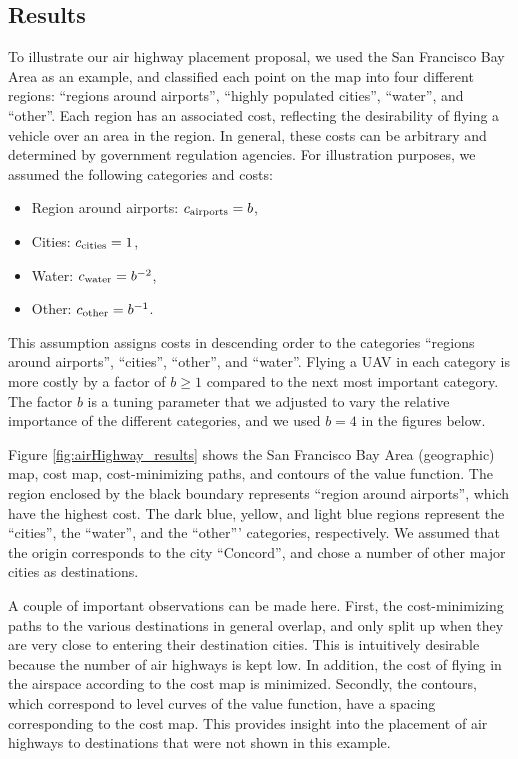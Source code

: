 \subsection{Results}
To illustrate our air highway placement proposal, we used the San Francisco Bay Area as an example, and classified each point on the map into four different regions: ``regions around airports'', ``highly populated cities'', ``water'', and ``other''. Each region has an associated cost, reflecting the desirability of flying a vehicle over an area in the region. In general, these costs can be arbitrary and determined by government regulation agencies. For illustration purposes, we assumed the following categories and costs:

\begin{itemize}
\item Region around airports: $c_\text{airports}=b$,
\item Cities: $c_\text{cities}=1$,
\item Water: $c_\text{water}=b^{-2}$,
\item Other: $c_\text{other}=b^{-1}$.
\end{itemize}

This assumption assigns costs in descending order to the categories ``regions around airports'', ``cities'', ``other'', and ``water''. Flying a UAV in each category is more costly by a factor of $b\ge1$ compared to the next most important category. The factor $b$ is a tuning parameter that we adjusted to vary the relative importance of the different categories, and we used $b=4$ in the figures below.

Figure \ref{fig:airHighway_results} shows the San Francisco Bay Area (geographic) map, cost map, cost-minimizing paths, and contours of the value function. The region enclosed by the black boundary represents ``region around airports'', which have the highest cost. The dark blue, yellow, and light blue regions represent the ``cities'', the ``water'', and the ``other''' categories, respectively. We assumed that the origin corresponds to the city ``Concord'', and chose a number of other major cities as destinations.

A couple of important observations can be made here. First, the cost-minimizing paths to the various destinations in general overlap, and only split up when they are very close to entering their destination cities. This is intuitively desirable because the number of air highways is kept low. In addition, the cost of flying in the airspace according to the cost map is minimized. Secondly, the contours, which correspond to level curves of the value function, have a spacing corresponding to the cost map. This provides insight into the placement of air highways to destinations that were not shown in this example.

